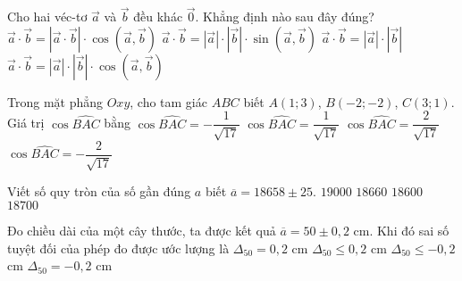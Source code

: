 \begin{ex}%
	Cho hai véc-tơ $\vec{a}$ và $\vec{b}$ đều khác $\vec{0}$. Khẳng định nào sau đây đúng?
	\choice
	{$\vec{a}\cdot \vec{b}=\left|\vec{a}\cdot \vec{b}\right|\cdot \cos \left(\vec{a}, \vec{b}\right)$}
	{$\vec{a}\cdot \vec{b}=\left|\vec{a}\right|\cdot \left|\vec{b}\right|\cdot \sin \left(\vec{a},\vec{b}\right)$}
	{$\vec{a}\cdot \vec{b}=\left|\vec{a}\right|\cdot \left|\vec{b}\right|$}
	{\True $\vec{a}\cdot \vec{b}=\left|\vec{a}\right|\cdot \left|\vec{b}\right|\cdot \cos \left(\vec{a},\vec{b}\right)$}
\end{ex}
\begin{ex}%
	Trong mặt phẳng $Oxy$, cho tam giác $ABC$ biết $A(1;3)$, $B(-2;-2)$, $C(3;1)$. Giá trị $\cos \widehat{BAC}$ bằng
	\choice
	{$\cos \widehat{BAC}=-\dfrac{1}{\sqrt{17}}$}
	{\True $\cos \widehat{BAC}=\dfrac{1}{\sqrt{17}}$}
	{$\cos \widehat{BAC}=\dfrac{2}{\sqrt{17}}$}
	{$\cos \widehat{BAC}=-\dfrac{2}{\sqrt{17}}$}
\end{ex}
\begin{ex}%
	Viết số quy tròn của số gần đúng $a$ biết $\overline{a}=18658\pm 25$.
	\choice
	{$19000$}
	{$18660$}
	{$18600$}
	{\True $18700$}
\end{ex}
\begin{ex}%
	Đo chiều dài của một cây thước, ta được kết quả $\overline{a}=50\pm0{,}2$ cm. Khi đó sai số tuyệt đối của phép đo được ước lượng là 
	\choice
	{\True $\Delta_{50}=0{,}2$ cm}
	{$\Delta_{50}\le 0{,}2$ cm}
	{$\Delta_{50}\le -0{,}2$ cm}
	{$\Delta_{50}=-0{,}2$ cm}
\end{ex}
